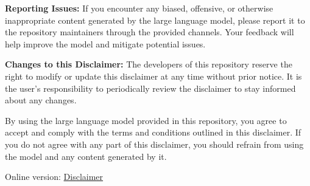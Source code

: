 \documentclass{article}
\begin{document}
\textbf{Reporting Issues:} If you encounter any biased, offensive, or otherwise inappropriate content generated by the large language model, please report it to the repository maintainers through the provided channels. Your feedback will help improve the model and mitigate potential issues.

\textbf{Changes to this Disclaimer:} The developers of this repository reserve the right to modify or update this disclaimer at any time without prior notice. It is the user's responsibility to periodically review the disclaimer to stay informed about any changes.

By using the large language model provided in this repository, you agree to accept and comply with the terms and conditions outlined in this disclaimer. If you do not agree with any part of this disclaimer, you should refrain from using the model and any content generated by it.

Online version: \href{https://github.com/h2oai/h2ogpt#disclaimer}{Disclaimer}

  
%  
\end{document}
